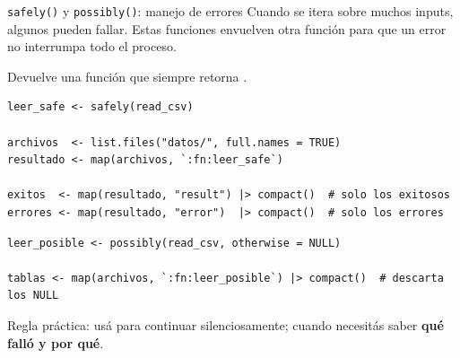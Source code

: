 \documentclass[8pt]{beamer}
\begin{document}
	\begin{frame}[fragile]{\texttt{safely()} y \texttt{possibly()}: manejo de errores}
		Cuando se itera sobre muchos inputs, algunos pueden fallar. Estas funciones envuelven otra función para que un error no interrumpa todo el proceso.

		Devuelve una función que siempre retorna .

\begin{lstlisting}[style=RScript]
leer_safe <- safely(read_csv)

archivos  <- list.files("datos/", full.names = TRUE)
resultado <- map(archivos, `:fn:leer_safe`)

exitos  <- map(resultado, "result") |> compact()  # solo los exitosos
errores <- map(resultado, "error")  |> compact()  # solo los errores
\end{lstlisting}


\begin{lstlisting}[style=RScript]
leer_posible <- possibly(read_csv, otherwise = NULL)

tablas <- map(archivos, `:fn:leer_posible`) |> compact()  # descarta los NULL
\end{lstlisting}

		\begin{block}{}
			Regla práctica: usá  para continuar silenciosamente;  cuando necesitás saber \textbf{qué falló y por qué}.
		\end{block}
	\end{frame}
\end{document}
